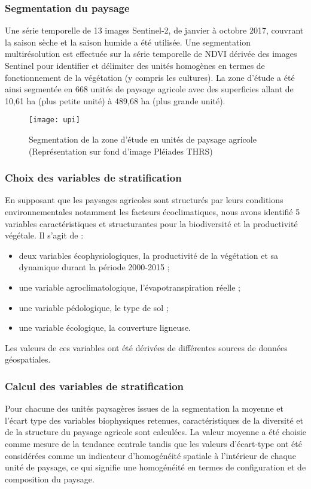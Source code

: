 \documentclass[a4paper, oneside, 12pt]{book}
\begin{document}
\subsubsection{Segmentation du paysage}
Une série temporelle de 13 images Sentinel-2, de janvier à octobre 2017, couvrant la saison sèche et la saison humide a été utilisée. Une segmentation multirésolution est effectuée sur la série temporelle de NDVI dérivée des images Sentinel pour identifier et délimiter des unités homogènes en termes de fonctionnement de la végétation (y compris les cultures). La zone d’étude a été ainsi segmentée en 668 unités de paysage agricole avec des superficies allant de 10,61 ha (plus petite unité) à 489,68 ha (plus grande unité). 
\begin{figure}[H]
	\centering
	\caption{Segmentation de la zone d’étude en unités de paysage agricole (Représentation sur fond d’image Pléiades THRS)}
	\texttt{[image: upi]}	
\end{figure}
\subsubsection{Choix des variables de stratification}
En supposant que les paysages agricoles sont structurés par leurs conditions environnementales notamment les facteurs écoclimatiques, nous avons identifié 5 variables caractéristiques et structurantes pour la biodiversité et la productivité végétale. Il s’agit de :
\begin{itemize}
	\item deux variables écophysiologiques, la productivité de la végétation et sa dynamique durant la période 2000-2015 ;
	\item une variable agroclimatologique, l’évapotranspiration réelle ; 
	\item une variable pédologique, le type de sol ;
	\item une variable écologique, la couverture ligneuse.
\end{itemize}
Les valeurs de ces variables ont été dérivées de différentes sources de données géospatiales.	
\subsubsection{Calcul des variables de stratification}
Pour chacune des unités paysagères issues de la segmentation la moyenne et l’écart type des variables biophysiques retenues, caractéristiques de la diversité et de la structure du paysage agricole sont calculées. La valeur moyenne a été choisie comme mesure de la tendance centrale tandis que les valeurs d'écart-type ont été considérées comme un indicateur d'homogénéité spatiale à l'intérieur de chaque unité de paysage, ce qui signifie une homogénéité en termes de configuration et de composition du paysage.
\end{document}
